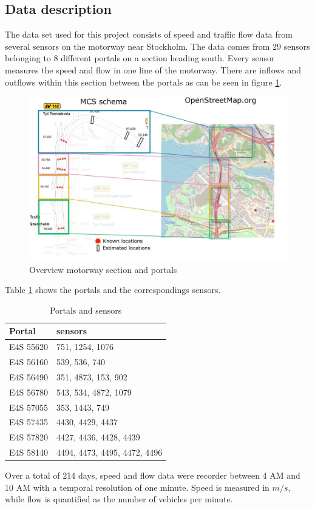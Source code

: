 	\subsection{Data description}
	The data set used for this project consists of speed and traffic flow data from several sensors on the motorway near Stockholm. The data comes from 29 sensors belonging to 8 different portals on a section heading south. Every sensor measures the speed and flow in one line of the motorway. There are inflows and outflows within this section between the portals as can be seen in figure \ref{fig:overview}.
	\begin{figure}[H]
		\centering
		\includegraphics[width=0.7\linewidth]{screenshots/overview}
		\caption{Overview motorway section and portals}
		\label{fig:overview}
	\end{figure}
	\noindent Table \ref{tab:portalsandsensors} shows the portals and the correspondings sensors.
	\begin{table}[H]
		\centering
		\caption{Portals and sensors}
		\label{tab:portalsandsensors}
		\begin{tabular}{|l|l|}
			\hline
			Portal & sensors \\
			\hline
			E4S 55620 & 751, 1254, 1076 \\
			E4S 56160 & 539, 536, 740 \\
			E4S 56490 & 351, 4873, 153, 902 \\
			E4S 56780 & 543, 534, 4872, 1079 \\
			E4S 57055 & 353, 1443, 749 \\
			E4S 57435 & 4430, 4429, 4437 \\
			E4S 57820 & 4427, 4436, 4428, 4439 \\
			E4S 58140 & 4494, 4473, 4495, 4472, 4496 \\
			\hline
		\end{tabular}
	\end{table}
	Over a total of 214 days, speed and flow data were recorder between 4 AM and 10 AM with a temporal resolution of one minute.
	Speed is measured in $\si{m/s}$, while flow is quantified as the number of vehicles per minute.
